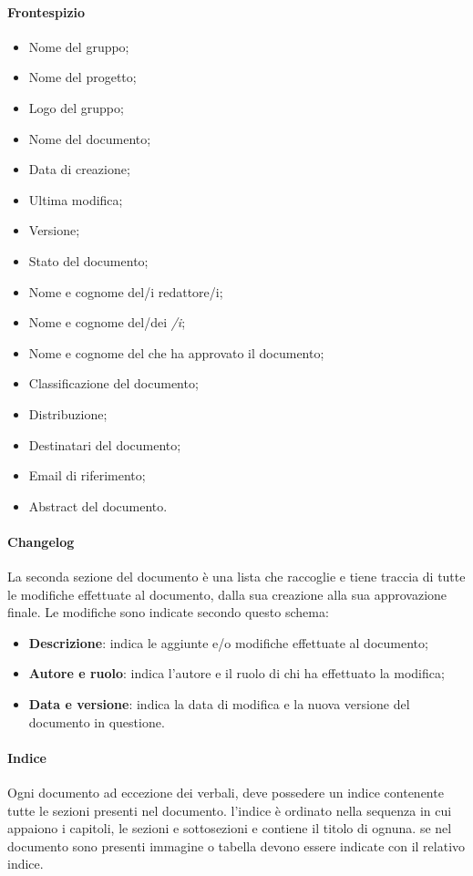 			\paragraph{Frontespizio}
			\begin{itemize}
				\item{Nome del gruppo;}
				\item{Nome del progetto;}
				\item{Logo del gruppo;}
				\item{Nome del documento;}
				\item{Data di creazione;}
				\item{Ultima modifica;}
				\item{Versione;}
				\item{Stato del documento;}
				\item{Nome e cognome del/i redattore/i;}
				\item{Nome e cognome del/dei \textit{\Ver/i};}
				\item{Nome e cognome del \textit{\RdP} che ha approvato il documento;}
				\item{Classificazione del documento;}
				\item{Distribuzione;}
				\item{Destinatari del documento;}
				\item{Email di riferimento;}
				\item{Abstract del documento.}
			\end{itemize}
	
			\paragraph{Changelog}
			La seconda sezione del documento è una lista che raccoglie e tiene traccia di tutte le modifiche effettuate al documento, dalla sua creazione alla sua approvazione finale. Le modifiche sono indicate secondo questo schema:
			\begin{itemize}
				\item\textbf{Descrizione}: indica le aggiunte e/o modifiche effettuate al documento;
				\item\textbf{Autore e ruolo}: indica l'autore e il ruolo di chi ha effettuato la modifica;
				\item\textbf{Data e versione}: indica la data di modifica e la nuova versione del documento in questione.
			\end{itemize}	

			\paragraph{Indice}
			Ogni documento ad eccezione dei verbali, deve possedere un indice contenente tutte le sezioni presenti nel documento. l'indice è ordinato nella sequenza in cui appaiono i capitoli, le sezioni e sottosezioni e contiene il titolo di ognuna. 
			se nel documento sono presenti immagine o tabella  devono essere indicate con il relativo indice.

